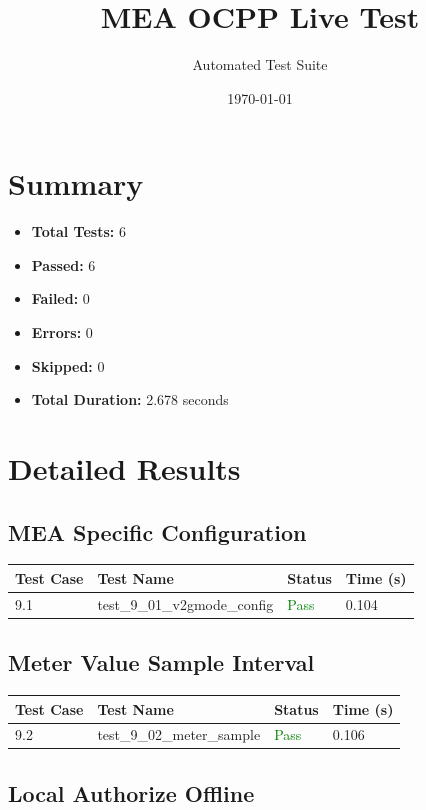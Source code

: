 \documentclass{article}
\title{MEA OCPP Live Test}
\author{Automated Test Suite}
\date{\today}
\begin{document}
\maketitle

\section{Summary}
\begin{itemize}
    \item \textbf{Total Tests:} 6
    \item \textbf{Passed:} 6
    \item \textbf{Failed:} 0
    \item \textbf{Errors:} 0
    \item \textbf{Skipped:} 0
    \item \textbf{Total Duration:} 2.678 seconds
\end{itemize}

\section{Detailed Results}
\subsection{MEA Specific Configuration}

\begin{longtable}{p{} p{} p{} p{}}
\toprule
\textbf{Test Case} & \textbf{Test Name} & \textbf{Status} & \textbf{Time (s)} \\
\midrule
\endhead
9.1 & test\_9\_01\_v2gmode\_config & \textcolor{green}{Pass} & 0.104 \\
\bottomrule
\end{longtable}
\subsection{Meter Value Sample Interval}

\begin{longtable}{p{} p{} p{} p{}}
\toprule
\textbf{Test Case} & \textbf{Test Name} & \textbf{Status} & \textbf{Time (s)} \\
\midrule
\endhead
9.2 & test\_9\_02\_meter\_sample & \textcolor{green}{Pass} & 0.106 \\
\bottomrule
\end{longtable}
\subsection{Local Authorize Offline}
\end{document}
